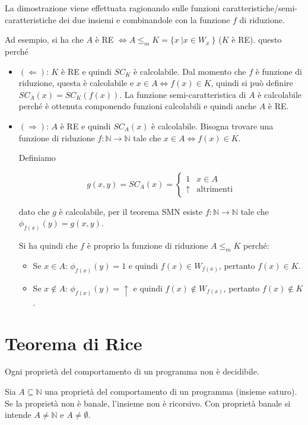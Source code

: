 La dimostrazione viene effettuata ragionando sulle funzioni caratteristiche/semi-caratteristiche dei due insiemi e combinandole con la funzione $f$ di riduzione.

Ad esempio, si ha che $A$ è RE $\Leftrightarrow A \leq_m K =  \{ x \: | x \in W_x\: \}$ ($K$ è RE). questo perché

\begin{itemize}
	\item $(\Leftarrow)$: $K$ è RE e quindi $SC_K$ è calcolabile. Dal momento che $f$ è funzione di riduzione, questa è calcolabile e $x \in A \Leftrightarrow f(x) \in K$, quindi si può definire $SC_A(x) = SC_K(f(x))$. La funzione semi-caratteristica di $A$ è calcolabile perché è ottenuta componendo funzioni calcolabili e quindi anche $A$ è RE.
	
	\item $(\Rightarrow)$: $A$ è RE e quindi $SC_A(x)$ è calcolabile. Bisogna trovare una funzione di riduzione $f : \mathbb{N} \rightarrow \mathbb{N}$  tale che  $x \in A \Leftrightarrow f(x) \in K$.
	
	Definiamo
	
	$$
	g(x,y) = SC_A(x) = \begin{cases}
	1& x \in A \\
	\uparrow &\text{altrimenti}
	\end{cases}
	$$ 
	
	dato che $g$ è calcolabile, per il teorema SMN esiste $f : \mathbb{N} \rightarrow \mathbb{N}$ tale che $\phi_{f(x)}(y)= g(x,y)$.
	
	Si ha quindi che $f$ è proprio la funzione di riduzione $A \leq_m K$ perché:
	
	\begin{itemize}
		\item Se $x \in A$: $\phi_{f(x)}(y) = 1$ e quindi $f(x) \in W_{f(x)}$, pertanto $f(x) \in K$.
		\item Se $x \notin A$: $\phi_{f(x)}(y) = \uparrow$ e quindi $f(x) \notin W_{f(x)}$, pertanto $f(x) \notin K$.
	\end{itemize}
\end{itemize}
 
\section{Teorema di Rice}

Ogni proprietà del comportamento di un programma non è decidibile.

Sia $A \subseteq \mathbb{N}$ una proprietà del comportamento di un programma (insieme saturo). Se la proprietà non è banale, l'insieme non è ricorsivo. Con proprietà banale si intende $A \neq \mathbb{N}$ e $A \neq \emptyset$. 

